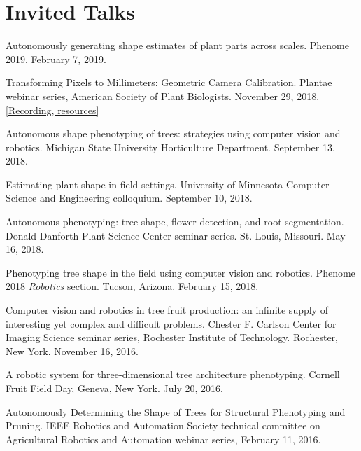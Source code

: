 \documentclass[letterpaper,11pt]{article}
\begin{document}
\section{Invited Talks}
\begin{enumerate}[leftmargin=*,label={[\arabic*]}]
\item{Autonomously generating shape estimates of plant parts across scales. Phenome 2019.  February 7, 2019.}

\item{Transforming Pixels to Millimeters: Geometric Camera Calibration.  Plantae webinar series, American Society of Plant Biologists.  November 29, 2018. \href{https://amytabb.com/tips/#geometric-camera-calibration-webinar}{[Recording, resources]}}

\item{Autonomous shape phenotyping of trees: strategies using computer vision and robotics. Michigan State University Horticulture Department. September 13, 2018.}

\item{Estimating plant shape in field settings. University of Minnesota Computer Science and Engineering colloquium. September 10, 2018.}

\item{Autonomous phenotyping: tree shape, flower detection, and root segmentation. Donald Danforth Plant Science Center seminar series.  St. Louis, Missouri.  May 16, 2018.}

\item{ Phenotyping tree shape in the field using computer vision and robotics.  Phenome 2018 {\it Robotics} section. Tucson, Arizona.  February 15, 2018. }

\item{ Computer vision and robotics in tree fruit production: an infinite supply of interesting yet complex and difficult problems. Chester F. Carlson Center for Imaging Science seminar series, Rochester Institute of Technology.  Rochester, New York.  November 16, 2016.}

\item{ A robotic system for three-dimensional tree architecture phenotyping.  Cornell Fruit Field Day, Geneva, New York.  July 20, 2016.}

\item{ Autonomously Determining the Shape of Trees for Structural Phenotyping and Pruning. IEEE Robotics and Automation Society technical committee on Agricultural Robotics and Automation webinar series, February 11, 2016.} 


\end{enumerate}
\end{document}
